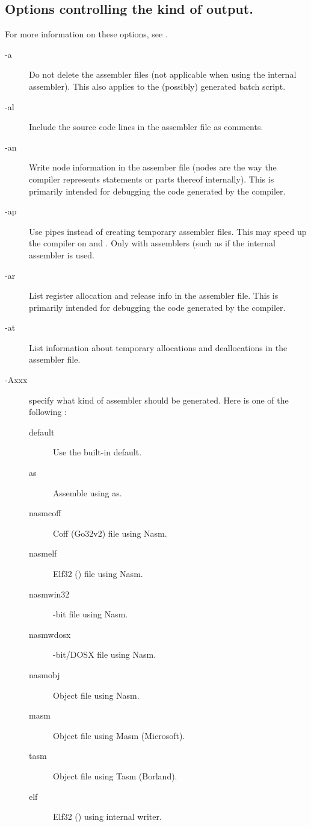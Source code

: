 \subsection{Options controlling the kind of output.}
\label{se:codegen}
For more information on these options, see \progref.
\begin{description}
\item [-a]  Do not delete the assembler files (not
applicable when using the internal assembler). This also applies
to the (possibly) generated batch script.
\item [-al]  Include the source code lines in the assembler
file as comments.
\item[-an]  Write node information in the
assember file (nodes are the way the compiler represents statements or parts
thereof internally). This is primarily intended for debugging
the code generated by the compiler.
\item[-ap]  Use pipes instead of creating temporary assembler
files.  This may speed up the compiler on \ostwo and \linux. 
Only with assemblers (such as \gnu %
if the internal assembler is used.
\item[-ar]  List register allocation and
release info in the assembler file. This is primarily intended for debugging
the code generated by the compiler.
\item[-at]  List information about
temporary allocations and deallocations in the assembler file.
\item [-Axxx]  specify what kind of assembler should be generated. 
Here  is one of the following :
\begin{description}
\item[default] Use the built-in default.
\item[as] Assemble using \gnu as.
\item[nasmcoff] Coff (Go32v2) file using Nasm.
\item[nasmelf] Elf32 (\linux) file using Nasm.
\item[nasmwin32] -bit file using Nasm.
\item[nasmwdosx] -bit/DOSX file using Nasm.
\item[nasmobj] Object file using Nasm.
\item[masm] Object file using Masm (Microsoft).
\item[tasm] Object file using Tasm (Borland).
\item[elf] Elf32 (\linux) using internal writer.

\end{description}
\end{description}
